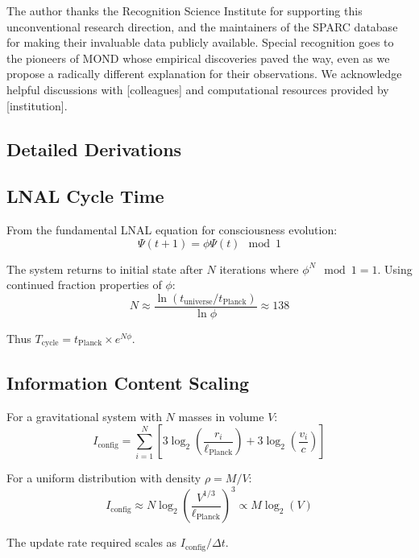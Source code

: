 \documentclass[twocolumn,prd,amsmath,amssymb,aps,superscriptaddress,nofootinbib]{revtex4-2}
\begin{document}
\acknowledgments

The author thanks the Recognition Science Institute for supporting this unconventional research direction, and the maintainers of the SPARC database for making their invaluable data publicly available. Special recognition goes to the pioneers of MOND whose empirical discoveries paved the way, even as we propose a radically different explanation for their observations. We acknowledge helpful discussions with [colleagues] and computational resources provided by [institution].

\begin{appendix}
\section{Detailed Derivations}
\label{app:derivations}

\subsection{LNAL Cycle Time}

From the fundamental LNAL equation for consciousness evolution:
\begin{equation}
\Psi(t+1) = \phi \Psi(t) \mod 1
\end{equation}

The system returns to initial state after $N$ iterations where $\phi^N \mod 1 = 1$. Using continued fraction properties of $\phi$:
\begin{equation}
N \approx \frac{\ln(t_{\text{universe}}/t_{\text{Planck}})}{\ln \phi} \approx 138
\end{equation}

Thus $T_{\text{cycle}} = t_{\text{Planck}} \times e^{N\phi}$.

\subsection{Information Content Scaling}

For a gravitational system with $N$ masses in volume $V$:
\begin{equation}
I_{\text{config}} = \sum_{i=1}^N \left[3\log_2\left(\frac{r_i}{\ell_{\text{Planck}}}\right) + 3\log_2\left(\frac{v_i}{c}\right)\right]
\end{equation}

For a uniform distribution with density $\rho = M/V$:
\begin{equation}
I_{\text{config}} \approx N \log_2\left(\frac{V^{1/3}}{\ell_{\text{Planck}}}\right)^3 \propto M \log_2(V)
\end{equation}

The update rate required scales as $I_{\text{config}}/\Delta t$.

\end{appendix}
\end{document}
